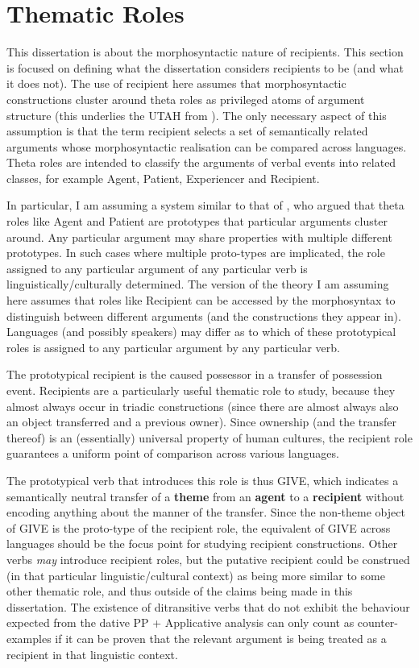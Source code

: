 \section{Thematic Roles}
This dissertation is about the morphosyntactic nature of recipients. This section is focused on defining what the dissertation considers recipients to be (and what it does not). The use of recipient here assumes that morphosyntactic constructions cluster around theta roles as privileged atoms of argument structure (this underlies the UTAH from \citealt{Baker.1988}). The only necessary aspect of this assumption is that the term recipient selects a set of semantically related arguments whose morphosyntactic realisation can be compared across languages. Theta roles are intended to classify the arguments of verbal events into related classes, for example Agent, Patient, Experiencer and Recipient. 

In particular, I am assuming a system similar to that of \cite{Dowty.1991}, who argued that theta roles like Agent and Patient are prototypes that particular arguments cluster around. Any particular argument may share properties with multiple different prototypes. In such cases where multiple proto-types are implicated, the role assigned to any particular argument of any particular verb is linguistically/culturally determined. The version of the theory I am assuming here assumes that roles like Recipient can be accessed by the morphosyntax to distinguish between different arguments (and the constructions they appear in). Languages (and possibly speakers) may differ as to which of these prototypical roles is assigned to any particular argument by any particular verb.

The prototypical recipient is the caused possessor in a transfer of possession event. Recipients are a particularly useful thematic role to study, because they almost always occur in triadic constructions (since there are almost always also an object transferred and a previous owner). Since ownership (and the transfer thereof) is an (essentially) universal property of human cultures, the recipient role guarantees a uniform point of comparison across various languages. 

The prototypical verb that introduces this role is thus GIVE, which indicates a semantically neutral transfer of a \textbf{theme} from an \textbf{agent} to a \textbf{recipient} without encoding anything about the manner of the transfer. Since the non-theme object of GIVE is the proto-type of the recipient role, the equivalent of GIVE across languages should be the focus point for studying recipient constructions. Other verbs \textit{may} introduce recipient roles, but the putative recipient could be construed (in that particular linguistic/cultural context) as being more similar to some other thematic role, and thus outside of the claims being made in this dissertation. The existence of ditransitive verbs that do not exhibit the behaviour expected from the dative PP + Applicative analysis can only count as counter-examples if it can be proven that the relevant argument is being treated as a recipient in that linguistic context.

